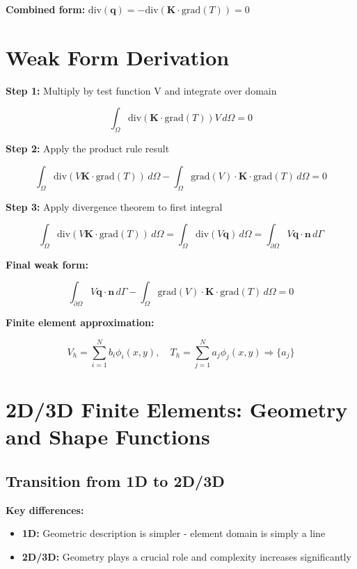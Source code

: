 \documentclass[
  11pt,
  a4paper,
]{scrbook}
\providecommand{\tightlist}{%
  \setlength{\itemsep}{0pt}\setlength{\parskip}{0pt}}\usepackage{longtable,booktabs,array}
\begin{document}
\textbf{Combined form:}
\(\text{div}(\mathbf{q}) = -\text{div}(\mathbf{K} \cdot \text{grad}(T)) = 0\)

\section{Weak Form Derivation}\label{weak-form-derivation}

\textbf{Step 1:} Multiply by test function V and integrate over domain

\[\int_\Omega \text{div}(\mathbf{K} \cdot \text{grad}(T)) V \, d\Omega = 0\]

\textbf{Step 2:} Apply the product rule result

\[\int_\Omega \text{div}(V \mathbf{K} \cdot \text{grad}(T)) \, d\Omega - \int_\Omega \text{grad}(V) \cdot \mathbf{K} \cdot \text{grad}(T) \, d\Omega = 0\]

\textbf{Step 3:} Apply divergence theorem to first integral

\[\int_\Omega \text{div}(V \mathbf{K} \cdot \text{grad}(T)) \, d\Omega = \int_\Omega \text{div}(V \mathbf{q}) \, d\Omega = \int_{\partial\Omega} V \mathbf{q} \cdot \mathbf{n} \, d\Gamma\]

\textbf{Final weak form:}

\[\int_{\partial\Omega} V \mathbf{q} \cdot \mathbf{n} \, d\Gamma - \int_\Omega \text{grad}(V) \cdot \mathbf{K} \cdot \text{grad}(T) \, d\Omega = 0\]

\textbf{Finite element approximation:}

\[V_h = \sum_{i=1}^N b_i \phi_i(x,y), \quad T_h = \sum_{j=1}^N a_j \phi_j(x,y) \Rightarrow \{a_j\}\]

\section{2D/3D Finite Elements: Geometry and Shape
Functions}\label{d3d-finite-elements-geometry-and-shape-functions}

\subsection{Transition from 1D to
2D/3D}\label{transition-from-1d-to-2d3d}

\textbf{Key differences:}

\begin{itemize}
\tightlist
\item
  \textbf{1D:} Geometric description is simpler - element domain is
  simply a line
\item
  \textbf{2D/3D:} Geometry plays a crucial role and complexity increases
  significantly
\end{itemize}
\end{document}
